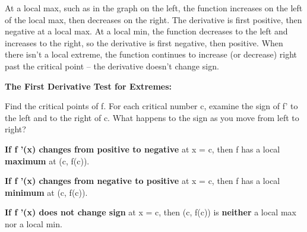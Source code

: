 At a local max, such as in the graph on the left, the function increases
on the left of the local max, then decreases on the right. The
derivative is first positive, then negative at a local max. At a local
min, the function decreases to the left and increases to the right, so
the derivative is first negative, then positive. When there isn't a
local extreme, the function continues to increase (or decrease) right
past the critical point -- the derivative doesn't change sign.

\textbf{The First Derivative Test for Extremes:}

Find the critical points of f. For each critical number c, examine the
sign of f' to the left and to the right of c. What happens to the sign
as you move from left to right?

\textbf{If f '(x) changes from positive to negative} at x = c, then f
has a local \textbf{maximum} at (c, f(c)).

\textbf{If f '(x) changes from negative to positive} at x = c, then f
has a local \textbf{minimum} at (c, f(c)).

\textbf{If f '(x) does not change sign} at x = c, then (c, f(c)) is
\textbf{neither} a local max nor a local min.

\textbf{\\
}

